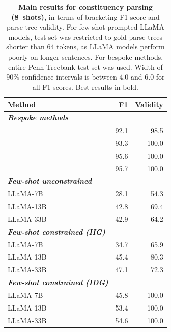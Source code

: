 \begin{table}[tb]
\centering
\setlength{\tabcolsep}{5pt}
\footnotesize
\begin{tabular}{@{}lrr@{}}
\toprule
\hspace{4mm} Method & F1 & Validity \\
\midrule
\emph{\textbf{Bespoke methods}}\\
\hspace{4mm} \citet{vinyals2015grammar} & 92.1 &  98.5 \\
\hspace{4mm} \citet{dyer2016recurrent} & 93.3 &  100.0 \\
\hspace{4mm} \citet{kitaev2018constituency} & 95.6 &  100.0 \\
\hspace{4mm} \citet{Zhang_2020} & 95.7 &  100.0 \\
\midrule
\emph{\textbf{Few-shot unconstrained}}\\
\hspace{4mm} LLaMA-7B        & 28.1 &    54.3 \\
\hspace{4mm} LLaMA-13B       & 42.8 &    69.4 \\
\hspace{4mm} LLaMA-33B       & 42.9 &    64.2 \\
\midrule
\emph{\textbf{Few-shot constrained (IIG)}}\\
\hspace{4mm} LLaMA-7B        & 34.7 &    65.9 \\
\hspace{4mm} LLaMA-13B       & 45.4 &    80.3 \\
\hspace{4mm} LLaMA-33B       & 47.1 &    72.3 \\
\midrule
\emph{\textbf{Few-shot constrained (IDG)}}\\
\hspace{4mm} LLaMA-7B        & 45.8 &    100.0 \\
\hspace{4mm} LLaMA-13B       & 53.4 &    100.0 \\
\hspace{4mm} LLaMA-33B       & 54.6 &    100.0 \\
\bottomrule
\end{tabular}
\caption{\textbf{Main results for constituency parsing (8~shots),} in terms of bracketing F1-score and parse-tree validity. For few-shot-prompted LLaMA models, test set was restricted to gold parse trees shorter than 64 tokens, as LLaMA models perform poorly on longer sentences. For bespoke methods, entire Penn Treebank test set was used.
Width of 90\% confidence intervals is between 4.0 and 6.0 for all F1-scores. Best results in bold.}
\label{tab:ConstituencyParsingResults}
\end{table}